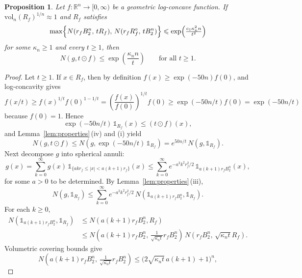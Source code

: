 \documentclass[11pt,leqno]{article}
\newtheorem{proposition}[theorem]{Proposition}
\theoremstyle{definition}
\theoremstyle{remark}
\numberwithin{equation}{section}
\newcommand{\vol}{\mathrm{vol}}
\newcommand{\ls}{\leqslant}
\newcommand{\gr}{\geqslant}
\begin{document}
\begin{proposition}\label{prop:fcover-2}
Let $f:\mathbb{R}^n\to[0,\infty)$ be a geometric log-concave function.
If $\vol_n(R_f)^{1/n}\approx 1$ and $R_f$ satisfies 
\begin{equation}\max\Bigl\{N(r_f B_2^n,\, t R_f),\,N(r_f R_f^{\circ},\, t B_2^n)\Bigr\}
\ls \exp\!\left( \tfrac{c_1 \kappa_n^2 n}{t^2} \right)\label{eq:R-covering-b}
\end{equation} 
for some $\kappa_n\gr 1$ and every $t\gr 1$, then
$$N(g,t\odot f)\ls \exp\!\left(\frac{\kappa_n n}{t}\right)\qquad\text{for all } t\gr 1.$$
\end{proposition}

\begin{proof}
Let $t\gr 1$. If $x\in R_f$, then by definition $f(x)\gr \exp(-50n)f(0)$, and log-concavity gives
\begin{equation}\label{eq:need-1}f(x/t)\gr f(x)^{1/t}f(0)^{1-1/t}=\left(\frac{f(x)}{f(0)}\right)^{1/t}f(0)\gr \exp(-50n/t)f(0)=\exp(-50n/t)\end{equation}
because $f(0)=1$. Hence
$$\exp(-50n/t)\,\mathds{1}_{R_f}(x)\ls (t\odot f)(x),$$
and Lemma~\ref{lem:properties}\,(iv) and (i) yield
\begin{equation}\label{eq:fcover-2.1}
N(g,t\odot f)\ls N(g,\exp(-50n/t)\,\mathds{1}_{R_f}) =e^{50n/t}\,N(g,\mathds{1}_{R_f}).
\end{equation}
Next decompose $g$ into spherical annuli:
\begin{equation}\label{eq:annuli}g(x)=\sum_{k=0}^{\infty}g(x)\,\mathds{1}_{\{ak r_f \ls |x|<a(k+1)r_f\}}(x)
\ls \sum_{k=0}^{\infty}e^{-a^2 k^2 r_f^2/2}\,\mathds{1}_{a(k+1)r_f B_2^n}(x),\end{equation}
for some $a>0$ to be determined. By Lemma~\ref{lem:properties}\,(iii),
\begin{equation}\label{eq:fcover-2.2}
N(g,\mathds{1}_{R_f})\ls \sum_{k=0}^{\infty}e^{-a^2 k^2 r_f^2/2}\,
N(\mathds{1}_{a(k+1)r_f B_2^n},\mathds{1}_{R_f}).
\end{equation}
For each $k\gr 0$,
\begin{align}\label{eq:lem-2-new}
N(\mathds{1}_{a(k+1)r_f B_2^n},\mathds{1}_{R_f})
&\ls N(a(k+1)r_f B_2^n,R_f)\\
\nonumber &\ls N\!\left(a(k+1)r_f B_2^n,\, \tfrac{1}{\sqrt{\kappa_nt}} r_f B_2^n\right)
\,N(r_f B_2^n,\, \sqrt{\kappa_nt} R_f).
\end{align}
Volumetric covering bounds give
$$N\!\left(a(k+1)r_f B_2^n,\,\tfrac{1}{\sqrt{\kappa_nt}} r_f B_2^n\right)\ls \bigl(2\sqrt{\kappa_nt}\,a(k+1)+1\bigr)^n,$$

\end{proof}
\end{document}
